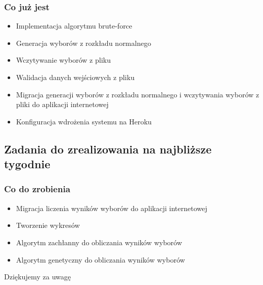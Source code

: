 \documentclass{beamer}
\begin{document}
\begin{frame}

\frametitle{Co już jest}
\begin{itemize}
\item Implementacja algorytmu brute-force
\item Generacja wyborów z rozkładu normalnego
\item Wczytywanie wyborów z pliku
\item Walidacja danych wejściowych z pliku
\item Migracja generacji wyborów z rozkładu normalnego i wczytywania wyborów z pliki do aplikacji internetowej
\item Konfiguracja wdrożenia systemu na Heroku
\end{itemize}

\end{frame}


\subsection{Zadania do zrealizowania na najbliższe tygodnie}

\begin{frame}

\frametitle{Co do zrobienia}
\begin{itemize}
\item Migracja liczenia wyników wyborów do aplikacji internetowej
\item Tworzenie wykresów
\item Algorytm zachłanny do obliczania wyników wyborów	
\item Algorytm genetyczny do obliczania wyników wyborów
\end{itemize}

\end{frame}


\begin{frame}
\Huge{\centerline{Dziękujemy za uwagę}}
\end{frame}
\end{document}
